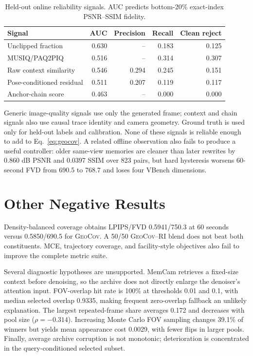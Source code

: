 \documentclass[10pt,twocolumn]{article}
\newcommand{\Geo}{\textsc{GeoCov}\xspace}
\newcommand{\RI}{\textsc{RI}\xspace}
\begin{document}
\begin{table}[!hbp]
\centering
\caption{Held-out online reliability signals. AUC predicts bottom-20\%
exact-index PSNR--SSIM fidelity.}
\small
\begin{tabular}{lrrrr}
\toprule
Signal & AUC & Precision & Recall & Clean reject \\
\midrule
Unclipped fraction & 0.630 & -- & 0.183 & 0.125 \\
MUSIQ/PAQ2PIQ & 0.516 & -- & 0.314 & 0.307 \\
Raw context similarity & 0.546 & 0.294 & 0.245 & 0.151 \\
Pose-conditioned residual & 0.511 & 0.207 & 0.119 & 0.117 \\
Anchor-chain score & 0.463 & -- & 0.000 & 0.000 \\
\bottomrule
\end{tabular}
\end{table}

Generic image-quality signals use only the generated frame; context and chain
signals also use causal trace identity and camera geometry. Ground truth is
used only for held-out labels and calibration. None of these signals is
reliable enough to add to Eq.~\ref{eq:geocov}. A related offline observation
also fails to produce a useful controller: older same-view memories are cleaner
than later rewrites by 0.860 dB PSNR and 0.0397 SSIM over 823 pairs, but hard
hysteresis worsens 60-second FVD from 690.5 to 768.7 and loses four VBench
dimensions.

\section{Other Negative Results}

Density-balanced coverage obtains LPIPS/FVD 0.5941/750.3 at 60 seconds versus
0.5850/690.5 for \Geo. A 50/50 \Geo--\RI blend does not beat both
constituents. MCE, trajectory coverage, and facility-style objectives also
fail to improve the complete metric suite.

Several diagnostic hypotheses are unsupported. MemCam retrieves a fixed-size
context before denoising, so the archive does not directly enlarge the
denoiser's attention input. FOV-overlap hit rate is 100\% at thresholds 0.01
and 0.1, with median selected overlap 0.9335, making frequent zero-overlap
fallback an unlikely explanation. The largest repeated-frame share averages
0.172 and decreases with
pool size ($\rho=-0.314$). Increasing Monte Carlo FOV sampling changes 39.1\%
of winners but yields mean appearance cost 0.0029, with fewer flips in larger
pools. Finally, average archive corruption is not monotonic; deterioration is
concentrated in the query-conditioned selected subset.
\end{document}
